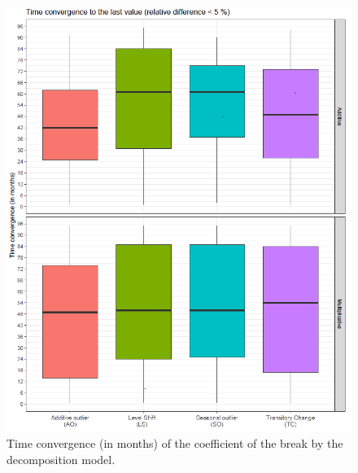 \documentclass[12pt, a4paper]{article}
\begin{document}
\begin{figure}[h!]
\begin{center}
 \includegraphics[scale=0.65]{img/OutliersConvergence.png}
 \caption[Time convergence (in months) of the coefficient of the break by the decomposition model]{Time convergence (in months) of the coefficient of the break by the decomposition model.}
 \label{fig:OutliersConvergence}
\end{center}
\end{figure}
\end{document}
